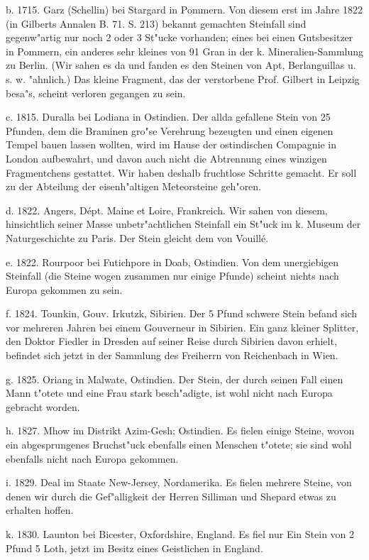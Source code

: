 \documentclass[a4paper, 11pt, oneside, polutonikogreek, german]{article}
\begin{document}
b. 1715. Garz (Schellin) bei Stargard in Pommern. Von diesem erst im Jahre 1822 (in Gilberts Annalen B. 71. S. 213) bekannt gemachten Steinfall sind gegenw"artig nur noch 2 oder 3 St"ucke vorhanden; eines bei einen Gutsbesitzer in Pommern, ein anderes sehr kleines von 91 Gran in der k. Mineralien-Sammlung zu Berlin. (Wir sahen es da und fanden es den Steinen von Apt, Berlanguillas u. s. w. "ahnlich.) Das kleine Fragment, das der verstorbene Prof. Gilbert in Leipzig besa"s, scheint verloren gegangen zu sein.

c. 1815. Duralla bei Lodiana in Ostindien. Der allda gefallene Stein von 25 Pfunden, dem die Braminen gro"se Verehrung bezeugten und einen eigenen Tempel bauen lassen wollten, wird im Hause der ostindischen Compagnie in London aufbewahrt, und davon auch nicht die Abtrennung eines winzigen Fragmentchens gestattet. Wir haben deshalb fruchtlose Schritte gemacht. Er soll zu der Abteilung der eisenh"altigen Meteorsteine geh"oren.

d. 1822. Angers, Dépt. Maine et Loire, Frankreich. Wir sahen von diesem, hinsichtlich seiner Masse unbetr"achtlichen Steinfall ein St"uck im k. Museum der Naturgeschichte zu Paris. Der Stein gleicht dem von Vouillé.

e. 1822. Rourpoor bei Futichpore in Doab, Ostindien. Von dem unergiebigen Steinfall (die Steine wogen zusammen nur einige Pfunde) scheint nichts nach Europa gekommen zu sein.

f. 1824. Tounkin, Gouv. Irkutzk, Sibirien. Der 5 Pfund schwere Stein befand sich vor mehreren Jahren bei einem Gouverneur in Sibirien. Ein ganz kleiner Splitter, den Doktor Fiedler in Dresden auf seiner Reise durch Sibirien davon erhielt, befindet sich jetzt in der Sammlung des Freiherrn von Reichenbach in Wien.

g. 1825. Oriang in Malwate, Ostindien. Der Stein, der durch seinen Fall einen Mann t"otete und eine Frau stark besch"adigte, ist wohl nicht nach Europa gebracht worden.

h. 1827. Mhow im Distrikt Azim-Gesh; Ostindien. Es fielen einige Steine, wovon ein abgesprungenes Bruchst"uck ebenfalls einen Menschen t"otete; sie sind wohl ebenfalls nicht nach Europa gekommen.

i. 1829. Deal im Staate New-Jersey, Nordamerika. Es fielen mehrere Steine, von denen wir durch die Gef"alligkeit der Herren Silliman und Shepard etwas zu erhalten hoffen.

k. 1830. Launton bei Bicester, Oxfordshire, England. Es fiel nur Ein Stein von 2 Pfund 5 Loth, jetzt im Besitz eines Geistlichen in England.
\end{document}
